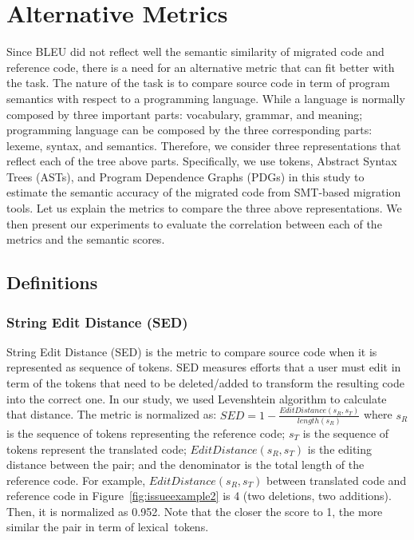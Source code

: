 \section{Alternative Metrics}

Since BLEU did not reflect well the semantic similarity of migrated
code and reference code, there is a need for an alternative metric
that can fit better with the task. The nature of the task is to
compare source code in term of program semantics with respect to a
programming language.
%
While a language is normally composed by three important parts:
vocabulary, grammar, and meaning; programming language can be composed
by the three corresponding parts: lexeme, syntax, and
semantics. 
%
Therefore, we consider three representations that reflect each of the
tree above parts. Specifically, we use tokens, Abstract Syntax Trees
(ASTs), and Program Dependence Graphs (PDGs) in this study to estimate
the semantic accuracy of the migrated code from SMT-based migration
tools.
%
Let us explain the metrics to compare the three above representations.
%
We then present our experiments to evaluate the correlation between
each of the metrics and the semantic scores.


\subsection{Definitions}

\subsubsection{\textbf{String Edit Distance (SED)}}
String Edit Distance (SED) is the metric to compare source code when
it is represented as sequence of tokens. SED measures efforts that a
user must edit in term of the tokens that need to be deleted/added to
transform the resulting code into the correct one. In our study, we
used Levenshtein algorithm to calculate that distance. The metric is
normalized as: $SED = 1 - \frac{EditDistance\left(s_R,
  s_T\right)}{length\left(s_R\right)}$ where $s_R$ is the sequence of
tokens representing the reference code; $s_T$ is the sequence of
tokens represent the translated code; $EditDistance\left(s_R,
s_T\right)$ is the editing distance between the pair; and the
denominator is the total length of the reference code. For example,
$EditDistance\left(s_R, s_T\right)$ between translated code and
reference code in Figure~\ref{fig:issueexample2} is 4 (two deletions,
two additions). Then, it is normalized as 0.952. Note that the closer
the score to 1, the more similar the pair in term of lexical~tokens.




 

